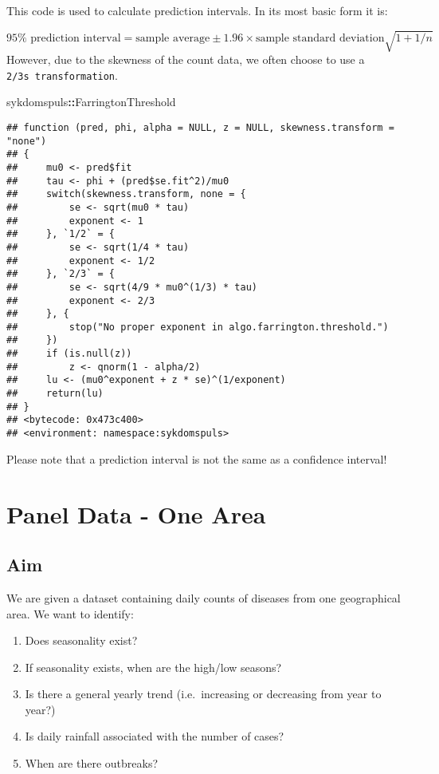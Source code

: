 \documentclass[]{book}
\newenvironment{Shaded}{\begin{snugshade}}{\end{snugshade}}
\newcommand{\OperatorTok}[1]{\textcolor[rgb]{0.81,0.36,0.00}{\textbf{#1}}}
\newcommand{\NormalTok}[1]{#1}
\providecommand{\tightlist}{%
  \setlength{\itemsep}{0pt}\setlength{\parskip}{0pt}}
\begin{document}
This code is used to calculate prediction intervals. In its most basic
form it is:

\[
95\% \text{ prediction interval} = \text{sample average} \pm 1.96 \times \text{sample standard deviation} \sqrt{ 1 + 1 / n}
\] However, due to the skewness of the count data, we often choose to
use a \texttt{2/3s\ transformation}.

\begin{Shaded}
\begin{Highlighting}[]
\NormalTok{sykdomspuls}\OperatorTok{::}\NormalTok{FarringtonThreshold}
\end{Highlighting}
\end{Shaded}

\begin{verbatim}
## function (pred, phi, alpha = NULL, z = NULL, skewness.transform = "none") 
## {
##     mu0 <- pred$fit
##     tau <- phi + (pred$se.fit^2)/mu0
##     switch(skewness.transform, none = {
##         se <- sqrt(mu0 * tau)
##         exponent <- 1
##     }, `1/2` = {
##         se <- sqrt(1/4 * tau)
##         exponent <- 1/2
##     }, `2/3` = {
##         se <- sqrt(4/9 * mu0^(1/3) * tau)
##         exponent <- 2/3
##     }, {
##         stop("No proper exponent in algo.farrington.threshold.")
##     })
##     if (is.null(z)) 
##         z <- qnorm(1 - alpha/2)
##     lu <- (mu0^exponent + z * se)^(1/exponent)
##     return(lu)
## }
## <bytecode: 0x473c400>
## <environment: namespace:sykdomspuls>
\end{verbatim}

Please note that a prediction interval is not the same as a confidence
interval!

\chapter{Panel Data - One Area}\label{panel-data---one-area}

\section{Aim}\label{aim}

We are given a dataset containing daily counts of diseases from one
geographical area. We want to identify:

\begin{enumerate}
\def\labelenumi{\arabic{enumi}.}
\tightlist
\item
  Does seasonality exist?
\item
  If seasonality exists, when are the high/low seasons?
\item
  Is there a general yearly trend (i.e.~increasing or decreasing from
  year to year?)
\item
  Is daily rainfall associated with the number of cases?
\item
  When are there outbreaks?
\end{enumerate}
\end{document}
